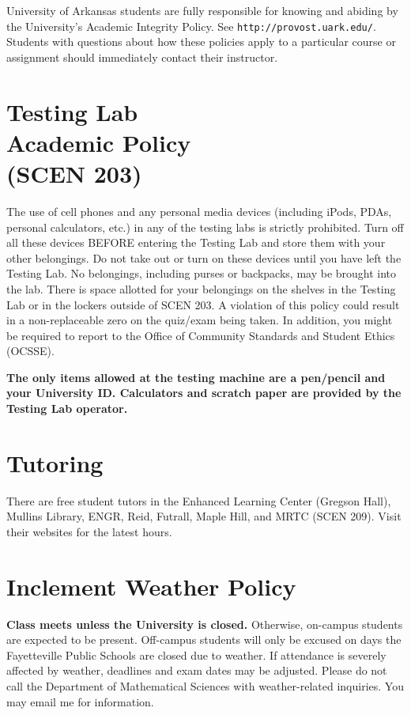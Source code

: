 \documentclass[margin,line,pifont,palatino,courier]{res}
\begin{document}
\begin{resume}
University of Arkansas students are fully responsible for knowing and abiding by the University's Academic Integrity Policy.  See \verb+http://provost.uark.edu/+. Students with questions about how these policies apply to a particular course or assignment should immediately contact their instructor.

\section{\sc Testing Lab \\ Academic Policy \\ (SCEN 203)} The use of cell phones and any personal media devices (including iPods, PDAs, personal calculators, etc.) in any of the testing labs is strictly prohibited. Turn off all these devices BEFORE entering the Testing Lab and store them with your other belongings. Do not take out or turn on these devices until you have left the Testing Lab. No belongings, including purses or backpacks, may be brought into the lab. There is space allotted for your belongings on the shelves in the Testing Lab or in the lockers outside of SCEN 203. A violation of this policy could result in a non-replaceable zero on the quiz/exam being taken. In addition, you might be required to report to the Office of Community Standards and Student Ethics (OCSSE). 

{\bf The only items allowed at the testing machine are a pen/pencil and your University ID. Calculators and scratch paper are provided by the Testing Lab operator. }

\section{\sc Tutoring} There are free student tutors in the Enhanced Learning Center (Gregson Hall), Mullins Library, ENGR, Reid, Futrall, Maple Hill, and MRTC (SCEN 209). Visit their websites for the latest hours.

\section{\sc Inclement Weather Policy} {\bf Class meets unless the University is closed.}  Otherwise, on-campus students are expected to be present.  Off-campus students will only be excused on days the Fayetteville Public Schools are closed due to weather.  If attendance is severely affected by weather, deadlines and exam dates may be adjusted.  Please do not call the Department of Mathematical Sciences with weather-related inquiries.  You may email me for information.


\end{resume}
\end{document}
